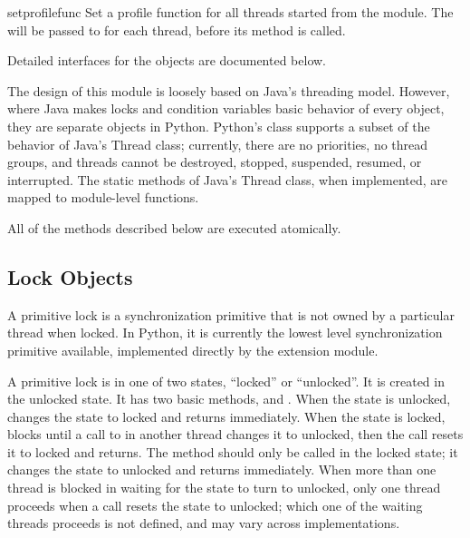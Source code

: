 \begin{funcdesc}{setprofile}{func}
Set a profile function  for all threads started
from the  module.  The  will be passed to 
 for each thread, before its 
method is called.
\end{funcdesc}

Detailed interfaces for the objects are documented below.  

The design of this module is loosely based on Java's threading model.
However, where Java makes locks and condition variables basic behavior
of every object, they are separate objects in Python.  Python's 
class supports a subset of the behavior of Java's Thread class;
currently, there are no priorities, no thread groups, and threads
cannot be destroyed, stopped, suspended, resumed, or interrupted.  The
static methods of Java's Thread class, when implemented, are mapped to
module-level functions.

All of the methods described below are executed atomically.


\subsection{Lock Objects \label{lock-objects}}

A primitive lock is a synchronization primitive that is not owned
by a particular thread when locked.  In Python, it is currently
the lowest level synchronization primitive available, implemented
directly by the  extension module.

A primitive lock is in one of two states, ``locked'' or ``unlocked''.
It is created in the unlocked state.  It has two basic methods,
 and .  When the state is
unlocked,  changes the state to locked and returns
immediately.  When the state is locked,  blocks
until a call to  in another thread changes it to
unlocked, then the  call resets it to locked and
returns.  The  method should only be called in the
locked state; it changes the state to unlocked and returns
immediately.  When more than one thread is blocked in
 waiting for the state to turn to unlocked, only one
thread proceeds when a  call resets the state to
unlocked; which one of the waiting threads proceeds is not defined,
and may vary across implementations.


